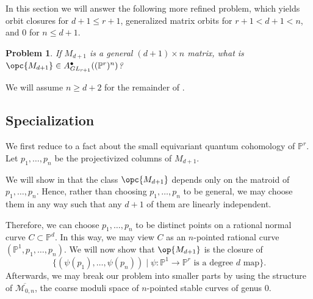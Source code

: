 \documentclass[12pt]{amsart}
\newcommand{\mb}{\mathbb}
\newcommand{\MM}{{\mathcal M}}
\theoremstyle{plain}
\newtheorem{Pro}[Thm]{Problem}
\theoremstyle{definition}
\theoremstyle{remark}
\begin{document}
In this section we will answer the following more refined problem, which yields orbit closures for $d+1 \le r+1$, generalized matrix orbits for $r+1<d+1<n$, and $0$ for $n \le d+1$.
\begin{Pro}
\label{ProR}
If $M_{d+1}$ is a general $(d+1)\times n$ matrix, what is $\opc{M_{d+1}}\in A^{\bullet}_{GL_{r+1}}((\mb{P}^r)^n)$?

\end{Pro}

We will assume $n\geq d+2$ for the remainder of . 

\subsection{Specialization}
\label{SKS}
We first reduce  to a fact about the small equivariant quantum cohomology of $\mb{P}^r$. Let $p_1,\ldots,p_n$ be the projectivized columns of $M_{d+1}$.

We will show in  that the class $\opc{M_{d+1}}$ depends only on the matroid of $p_1,\ldots,p_n$. Hence, rather than choosing $p_1, \ldots, p_n$ to be general, we may choose them in any way such that any $d+1$ of them are linearly independent. 

Therefore, we can choose $p_1,\ldots,p_n$ to be distinct points on a rational normal curve $C\subset \mb{P}^d$. In this way, we may view $C$ as an $n$-pointed rational curve $(\mb{P}^1,p_1,\ldots,p_n)$. We will now show that $\op{M_{d+1}}$ is the closure of \[\{(\psi(p_1), \ldots, \psi(p_n)) \mid \text{$\psi:\mb{P}^1 \to \mb{P}^r$ is a degree $d$ map}\}.\] Afterwards, we may break our problem into smaller parts by using the structure of $\overline{\MM_{0, n}}$, the coarse moduli space of $n$-pointed stable curves of genus $0$.
\end{document}
